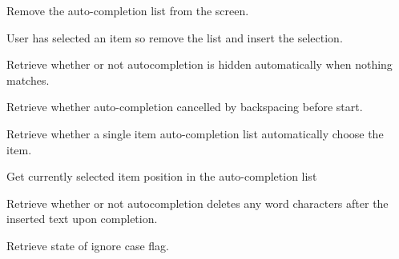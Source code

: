 
Remove the auto-completion list from the screen.


\label{wxstyledtextctrlautocompcomplete}


User has selected an item so remove the list and insert the selection.


\label{wxstyledtextctrlautocompgetautohide}


Retrieve whether or not autocompletion is hidden automatically when nothing matches.


\label{wxstyledtextctrlautocompgetcancelatstart}


Retrieve whether auto-completion cancelled by backspacing before start.


\label{wxstyledtextctrlautocompgetchoosesingle}


Retrieve whether a single item auto-completion list automatically choose the item.


\label{wxstyledtextctrlautocompgetcurrent}


Get currently selected item position in the auto-completion list


\label{wxstyledtextctrlautocompgetdroprestofword}


Retrieve whether or not autocompletion deletes any word characters
after the inserted text upon completion.


\label{wxstyledtextctrlautocompgetignorecase}


Retrieve state of ignore case flag.


\label{wxstyledtextctrlautocompgetmaxheight}

